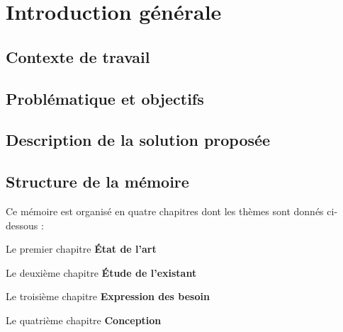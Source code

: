 \chapter*{Introduction générale}
\label{chap:introduction}

\section*{Contexte de travail}


\medskip

\section*{Problématique et objectifs}


\section*{Description de la solution proposée}


\section*{Structure de la mémoire}

Ce mémoire est organisé en quatre chapitres dont les thèmes sont donnés ci-dessous :

\medskip

Le premier chapitre \og \textbf{État de l'art} 
\medskip

Le deuxième chapitre \og \textbf{Étude de l'existant}
\medskip

Le troisième chapitre \og \textbf{Expression des besoin} 

Le quatrième chapitre \og \textbf{Conception} \fg 


\medskip
